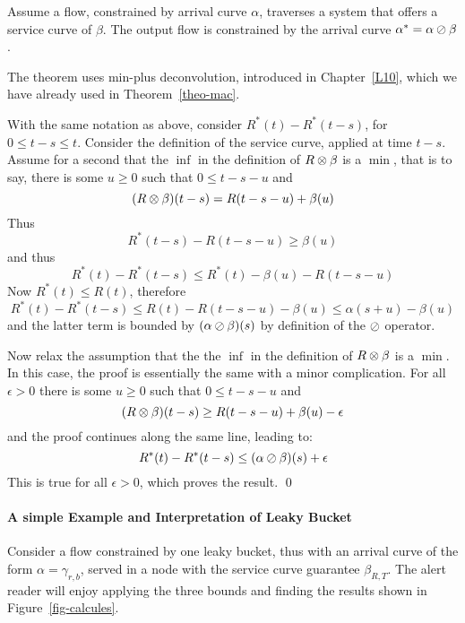 \begin{theorem}
Assume a flow, constrained by arrival curve $\alpha$, traverses a
system that offers a service curve of $\beta$.  The output flow is
constrained by the arrival curve $\alpha^{*}=\alpha \oslash \beta$.
\end{theorem}
The theorem uses min-plus deconvolution, introduced in
Chapter~\ref{L10}, which we have already used in
Theorem~\ref{theo-mac}.

\pr
With the same notation as above, consider $R^{*}(t) - R^{*}(t-s)$,
for $0 \leq t-s \leq t$. Consider the definition of the service
curve, applied at time $t-s$. Assume for a second that the $\inf$
in the definition of $R\otimes \beta$ is a $\min$, that is to say,
there is some $u \geq 0$ such that $0\leq t-s-u$ and
$$(R\otimes \beta )(t-s)=R(t-s-u) + \beta(u)
$$
Thus
$$ R^{*}(t-s) - R(t-s-u) \geq \beta(u)
$$ and thus
$$ R^{*}(t) - R^{*}(t-s) \leq R^{*}(t) - \beta(u) - R(t-s-u) $$
Now $ R^{*}(t) \leq R(t)$,  therefore $$ R^{*}(t) - R^{*}(t-s)
\leq R(t) - R(t-s-u) - \beta(u) \leq \alpha(s+u) -\beta(u) $$ and
the latter term is bounded by $(\alpha \oslash \beta) (s)$ by
definition of the $\oslash$ operator.

Now relax the assumption that the the $\inf$ in the definition of
$R\otimes \beta$ is a $\min$. In this case, the proof is essentially
the same with a minor complication. For all $\epsilon
>0$ there is some $u\geq 0$ such that $0\leq t-s-u$ and
$$(R\otimes \beta )(t-s)\geq R(t-s-u) + \beta(u)- \epsilon$$
and the proof continues along the same line, leading to:
$$ R^{*}(t) - R^{*}(t-s)
\leq (\alpha \oslash \beta) (s) + \epsilon$$ This is true for all
$\epsilon >0$, which proves the result. \qed

\paragraph{A simple Example and Interpretation of Leaky Bucket}
\begin{figure}[!htbp]
\end{figure}
Consider a flow constrained by one leaky bucket, thus with an
arrival curve of the form $\alpha=\gamma_{r,b}$, served in a node
with the service curve guarantee $\beta_{R,T}$. The alert reader
will enjoy applying the three bounds and finding the results shown
in Figure~\ref{fig-calcules}.

